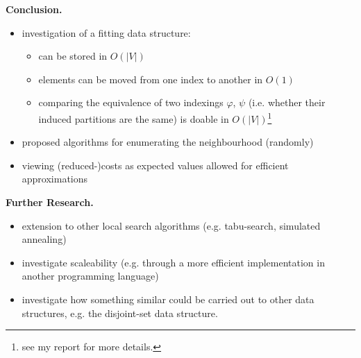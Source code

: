 \documentclass[10pt]{beamer}
\newcommand{\idx}{\varphi}
\newcommand{\varidx}{\psi}
\begin{document}
\begin{frame}
    \textbf{Conclusion.}
    \begin{itemize}
        \item investigation of a fitting data structure:
        \begin{itemize}
            \item can be stored in $O(|V|)$
            \item elements can be moved from one index to another in $O(1)$
            \item comparing the equivalence of two indexings $\idx$, $\varidx$ (i.e. whether their induced partitions are the same) is doable in $O(|V|)$\footnote{see my report for more details.}
        \end{itemize}
        \item proposed algorithms for enumerating the neighbourhood (randomly)
        \item viewing (reduced-)costs as expected values allowed for efficient approximations
    \end{itemize}
    \pause
    \textbf{Further Research.}
    \begin{itemize}
        \item extension to other local search algorithms (e.g. tabu-search, simulated annealing)
        \item investigate scaleability (e.g. through a more efficient implementation in another programming language)
        \item investigate how something similar could be carried out to other data structures, e.g. the disjoint-set data structure.
    \end{itemize}    
\end{frame}

%     
\end{document}
